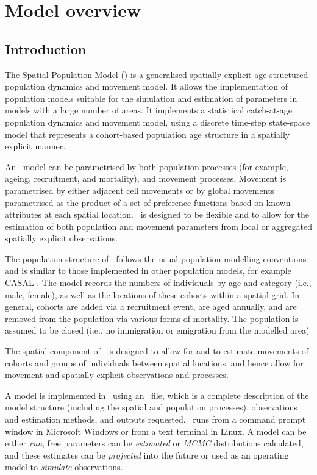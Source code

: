 \section{Model overview\label{sec:getting-started}}

\subsection{Introduction}

The Spatial Population Model (\SPM) is a generalised spatially explicit age-structured population dynamics and movement model. It allows the implementation of population models suitable for the simulation and estimation of parameters in models with a large number of areas. It implements a statistical catch-at-age population dynamics and movement model, using a discrete time-step state-space model that represents a cohort-based population age structure in a spatially explicit manner. 

An \SPM\ model can be parametrised by both population processes (for example, ageing, recruitment, and mortality), and movement processes. Movement is parametrised by either adjacent cell movements or by global movements parametrised as the product of a set of preference functions based on known attributes at each spatial location. \SPM\ is designed to be flexible and to allow for the estimation of both population and movement parameters from local or aggregated spatially explicit observations. 

The population structure of \SPM\ follows the usual population modelling conventions and is similar to those implemented in other population models, for example CASAL \citep{1388}. The model records the numbers of individuals by age and category (i.e., male, female), as well as the locations of these cohorts within a spatial grid. In general, cohorts are added via a recruitment event, are aged annually, and are removed from the population via various forms of mortality. The population is assumed to be closed (i.e., no immigration or emigration from the modelled area)

The spatial component of \SPM\ is designed to allow for and to estimate movements of cohorts and groups of individuals between spatial locations, and hence allow for movement and spatially explicit observations and processes. 

A model is implemented in \SPM\ using an \config\ file, which is a complete description of the model structure (including the spatial and population processes), observations and estimation methods, and outputs requested. \SPM\ runs from a command prompt window in Microsoft Windows or from a text terminal in Linux. A model can be either \emph{run}, free parameters can be \emph{estimated} or \emph{MCMC} distributions calculated, and these estimates can be \emph{projected} into the future or used as an operating model to \emph{simulate} observations.

